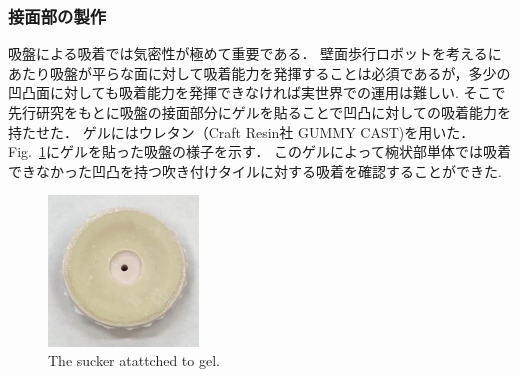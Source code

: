\documentclass[uplatex,dvipdfmx]{jlreq}
\begin{document}
\subsubsection{接面部の製作}
吸盤による吸着では気密性が極めて重要である\cite{長田勇一2016壁面}．
壁面歩行ロボットを考えるにあたり吸盤が平らな面に対して吸着能力を発揮することは必須であるが，多少の凹凸面に対しても吸着能力を発揮できなければ実世界での運用は難しい.
そこで先行研究\cite{長田勇一2016壁面}をもとに吸盤の接面部分にゲルを貼ることで凹凸に対しての吸着能力を持たせた．
ゲルにはウレタン（Craft Resin社 GUMMY CAST)を用いた．
Fig.~\ref{fig:gelatattchedsucker}にゲルを貼った吸盤の様子を示す．
このゲルによって椀状部単体では吸着できなかった凹凸を持つ吹き付けタイルに対する吸着を確認することができた.

\begin{figure}
    \centering
    \includegraphics[width=40mm]{./figure/gelsucker.jpg}
    \caption{The sucker atattched to gel.}
    \label{fig:gelatattchedsucker}
\end{figure}
\end{document}
